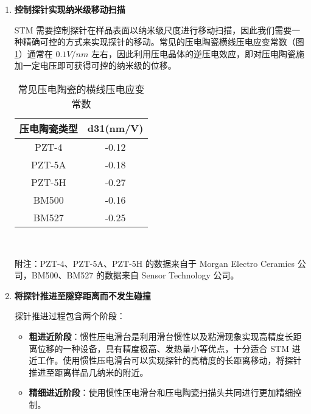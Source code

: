 \documentclass{article}
\begin{document}
\begin{spacing}{1.625}
\begin{enumerate}
		
		
		
		\item \textbf{控制探针实现纳米级移动扫描}\par
		\qquad STM 需要控制探针在样品表面以纳米级尺度进行移动扫描，因此我们需要一种精确可控的方式来实现探针的移动。常见的压电陶瓷横线压电应变常数（图 \ref{tab1}）通常在 $0.1V/nm$ 左右，因此利用压电晶体的逆压电效应，即对压电陶瓷施加一定电压即可获得可控的纳米级的位移。
		
		\begin{table}[H]
			\small
			\caption{常见压电陶瓷的横线压电应变常数}
			\centering
			\begin{tabular}{cc}
				\toprule
				\qquad\textbf{压电陶瓷类型}\qquad\qquad &\qquad \textbf{d31(nm/V)} \qquad\qquad  \\ 
				\midrule
				PZT-4	&	-0.12	\\  
				PZT-5A 	& 	-0.18	\\
				PZT-5H 	& 	-0.27	\\
				BM500 	&	-0.16	\\
				BM527	&	-0.25	\\
				\bottomrule
			\end{tabular}\\\vskip 1mm
			\begin{minipage}{0.5\linewidth}
				附注：PZT-4、PZT-5A、PZT-5H 的数据来自于 Morgan Electro Ceramics 公司，BM500、BM527 的数据来自 Sensor Technology 公司。 
			\end{minipage}
			\label{tab1}
		\end{table}
		
		
		
		
		
		\item \textbf{将探针推进至隧穿距离而不发生碰撞}\par
		探针推进过程包含两个阶段：
		\begin{itemize}
			\item \textbf{粗进近阶段}：惯性压电滑台是利用滑台惯性以及粘滑现象实现高精度长距离位移的一种设备，具有精度极高、发热量小等优点，十分适合 STM 进近工作。使用惯性压电滑台可以实现探针的高精度的长距离移动，将探针推进至距离样品几纳米的附近。
			
			\item \textbf{精细进近阶段}：使用惯性压电滑台和压电陶瓷扫描头共同进行更加精细控制。
			
		\end{itemize}
		
		
		
		
		

\end{enumerate}
\end{spacing}
\end{document}
